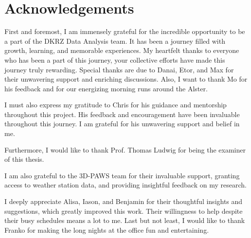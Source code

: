 \section*{Acknowledgements}

First and foremost, I am immensely grateful for the incredible opportunity to be a part of the DKRZ Data Analysis team.
It has been a journey filled with growth, learning, and memorable experiences.
My heartfelt thanks to everyone who has been a part of this journey, your collective efforts have made this journey truly rewarding. Special thanks are due to Danai, Etor, and Max for their unwavering support and enriching discussions.
Also, I want to thank Mo for his feedback and for our energizing morning runs around the Alster.

I must also express my gratitude to Chris for his guidance and mentorship throughout this project.
His feedback and encouragement have been invaluable throughout this journey.
I am grateful for his unwavering support and belief in me.

Furthermore, I would like to thank Prof. Thomas Ludwig for being the examiner of this thesis.

I am also grateful to the 3D-PAWS team for their invaluable support, granting access to weather station data, and providing insightful feedback on my research.

I deeply appreciate Alisa, Iason, and Benjamin for their thoughtful insights and suggestions, which greatly improved this work.
Their willingness to help despite their busy schedules means a lot to me.
Last but not least, I would like to thank Franko for making the long nights at the office fun and entertaining.






